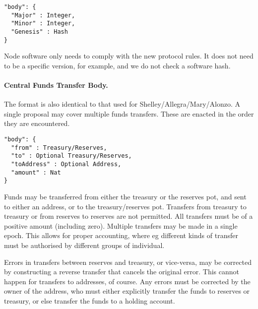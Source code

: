 \begin{verbatim}
"body": {
  "Major" : Integer,
  "Minor" : Integer,
  "Genesis" : Hash
}
\end{verbatim}

Node software only needs to comply with the new protocol rules.  It does not need to be a specific version, for example, and we do not check a software hash.



\paragraph{Central Funds Transfer Body.}  The format is also identical to that used for Shelley/Allegra/Mary/Alonzo.
A single proposal may cover multiple funds transfers.  These are enacted in the order they are encountered.

\begin{verbatim}
"body": {
  "from" : Treasury/Reserves,
  "to" : Optional Treasury/Reserves,
  "toAddress" : Optional Address,
  "amount" : Nat
}
\end{verbatim}

Funds may be transferred from either the treasury or the reserves pot, and sent to either an address, or to the treasury/reserves pot.
Transfers from treasury to treasury or from reserves to reserves are not permitted.  All transfers must be of a positive amount (including zero).
Multiple transfers may be made in a single epoch.  This allows for proper accounting, where eg different kinds of transfer must
be authorised by different groups of individual.

Errors in transfers between reserves and treasury, or vice-versa, may be corrected by constructing a reverse transfer that cancels the original error.
This cannot happen for transfers to addresses, of course.  Any errors must be corrected by the owner of the address, who must either explicitly transfer
the funds to reserves or treasury, or else transfer the funds to a holding account. 

